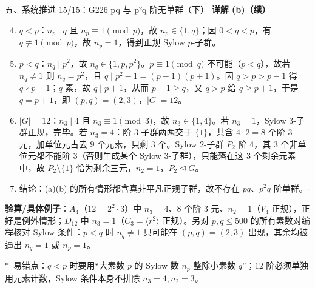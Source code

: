 \documentclass[aspectratio=169,10pt,fontset=none]{ctexbeamer}
\newcommand{\key}[1]{\textcolor{ink}{\bfseries #1}}
\newcommand{\starpt}{\textcolor{accent}{\bfseries$\ast$}}
\begin{document}
\begin{frame}[t]{五、系统推进 15/15：G226 pq 与 p²q 阶无单群（下）}
\scriptsize
\key{详解 (b)（续）}
\begin{enumerate}
  \setcounter{enumi}{3}
  \item $q<p$：$n_p\mid q$ 且 $n_p\equiv1\pmod p$，故 $n_p\in\{1,q\}$；因 $0<q<p$，有 $q\not\equiv1\pmod p$，故 $n_p=1$，得到正规 Sylow $p$-子群。
  \item $p<q$：$n_q\mid p^2$，故 $n_q\in\{1,p,p^2\}$。$p\equiv1\pmod q$ 不可能（$p<q$），故若 $n_q\ne1$ 则 $n_q=p^2$，且 $q\mid p^2-1=(p-1)(p+1)$。因 $q>p>p-1$ 得 $q\nmid p-1$；$q$ 素，故 $q\mid p+1$，从而 $p+1\ge q$，又 $q>p$ 给 $q\ge p+1$，于是 $q=p+1$，即 $(p,q)=(2,3)$，$|G|=12$。
  \item $|G|=12$：$n_3\mid4$ 且 $n_3\equiv1\pmod3$，故 $n_3\in\{1,4\}$。若 $n_3=1$，Sylow $3$-子群正规，完毕。若 $n_3=4$：阶 $3$ 子群两两交于 $\{1\}$，共含 $4\cdot2=8$ 个阶 $3$ 元，加单位元占去 $9$ 个元素，只剩 $3$ 个。Sylow $2$-子群 $P_2$ 阶 $4$，其 $3$ 个非单位元都不能阶 $3$（否则生成某个 Sylow $3$-子群），只能落在这 $3$ 个剩余元素中，故 $P_2\setminus\{1\}$ 恰为剩余三元，$n_2=1$，$P_2\trianglelefteq G$。
  \item 结论：(a)(b) 的所有情形都含真非平凡正规子群，故不存在 $pq$、$p^2q$ 阶单群。$\square$
\end{enumerate}
\key{验算/具体例子}：$A_4$（$12=2^2\cdot3$）中 $n_3=4$、$8$ 个阶 $3$ 元、$n_2=1$（$V_4$ 正规），正好是例外情形；$D_{12}$ 中 $n_3=1$（$C_3=\langle r^2\rangle$ 正规）。另对 $p,q\le500$ 的所有素数对编程核对 Sylow 条件：$p<q$ 时 $n_q\ne1$ 只可能在 $(p,q)=(2,3)$ 出现，其余均被逼出 $n_q=1$ 或 $n_p=1$。

\starpt~易错点：$q<p$ 时要用“大素数 $p$ 的 Sylow 数 $n_p$ 整除小素数 $q$”；$12$ 阶必须单独用元素计数，Sylow 条件本身不排除 $n_3=4,n_2=3$。
\end{frame}
\end{document}
